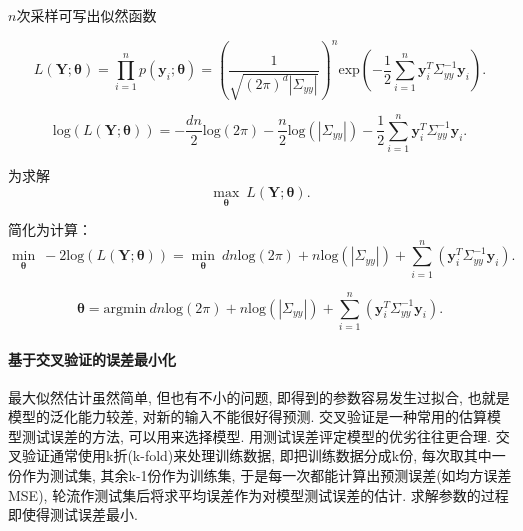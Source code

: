                 $n$次采样可写出似然函数

                \begin{equation}
                    L(\boldsymbol{Y};\boldsymbol{\theta})=\prod^{n}_{i=1}p(\boldsymbol{y}_{i};\boldsymbol{\theta})= (\frac{1}{\sqrt{(2\pi)^{d}|\Sigma_{yy}|}})^{n}\mathrm{exp}\left(-\frac{1}{2}\sum\limits^{n}_{i=1}\boldsymbol{y}^{T}_{i}\Sigma_{yy}^{-1}\boldsymbol{y}_{i}\right).
                \end{equation}

                \begin{equation}
                    \mathrm{log}(L(\boldsymbol{Y};\boldsymbol{\theta})) = -\frac{dn}{2}\mathrm{log}(2\pi) - \frac{n}{2}\mathrm{log}(|\Sigma_{yy}|) - \frac{1}{2}\sum\limits^{n}_{i=1}\boldsymbol{y}^{T}_{i}\Sigma_{yy}^{-1}\boldsymbol{y}_{i}.
                \end{equation}

                为求解
                \begin{equation}
                    \max_{\boldsymbol{\theta}} \ L(\boldsymbol{Y};\boldsymbol{\theta}).
                \end{equation}


                简化为计算：
                \begin{equation}
                    \min_{\boldsymbol{\theta}} \ -2\mathrm{log}(L(\boldsymbol{Y};\boldsymbol{\theta})) = \min_{\boldsymbol{\theta}} \ dn\mathrm{log}(2\pi)+n\mathrm{log}(|\Sigma_{yy}|)+\sum\limits^{n}_{i=1}(\boldsymbol{y}_{i}^{T}\Sigma_{yy}^{-1}\boldsymbol{y}_{i}).
                \end{equation}

                \begin{equation}
                    \boldsymbol{\theta}=\mathrm{argmin} \ dn\mathrm{log}(2\pi)+n\mathrm{log}(|\Sigma_{yy}|)+\sum\limits^{n}_{i=1}(\boldsymbol{y}_{i}^{T}\Sigma_{yy}^{-1}\boldsymbol{y}_{i}).
                \end{equation}

            \paragraph{基于交叉验证的误差最小化}
                最大似然估计虽然简单, 但也有不小的问题, 即得到的参数容易发生过拟合, 也就是模型的泛化能力较差, 对新的输入不能很好得预测. 交叉验证是一种常用的估算模型测试误差的方法, 可以用来选择模型. 用测试误差评定模型的优劣往往更合理. 交叉验证通常使用k折(k-fold)来处理训练数据, 即把训练数据分成k份, 每次取其中一份作为测试集, 其余k-1份作为训练集, 于是每一次都能计算出预测误差(如均方误差MSE), 轮流作测试集后将求平均误差作为对模型测试误差的估计. 求解参数的过程即使得测试误差最小.


